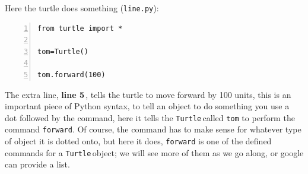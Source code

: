 \documentclass[11pt,a4paper]{scrartcl}
\newcommand{\turtle}{\texttt{Turtle}\,}
\newcommand{\lnn}[1]{\textbf{line #1}\,}
\begin{document}
Here the turtle does something (\texttt{line.py}):
\begin{lstlisting}[numbers=left]
from turtle import *

tom=Turtle()

tom.forward(100)
\end{lstlisting}
The extra line, \lnn{5}, tells the turtle to move forward by 100
units, this is an important piece of Python syntax, to tell an object
to do something you use a dot followed by the command, here it tells
the \turtle called \texttt{tom} to perform the command
\texttt{forward}. Of course, the command has to make sense for
whatever type of object it is dotted onto, but here it does,
\texttt{forward} is one of the defined commands for a \turtle object;
we will see more of them as we go along, or google can provide a list.
\begin{center}
\end{center}
\end{document}
